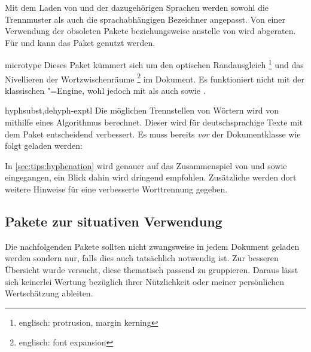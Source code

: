 \begin{packages}
  Mit dem Laden von  und der dazugehörigen Sprachen werden 
  sowohl die Trennmuster als auch die sprachabhängigen Bezeichner angepasst.
  Von einer Verwendung der obsoleten Pakete  beziehungsweise 
   anstelle von  wird abgeraten. Für 
   und  kann das Paket  
  genutzt werden.
\item[microtype]
  Dieses Paket kümmert sich um den optischen Randausgleich%
  \footnote{englisch: protrusion, margin kerning}
  und das Nivellieren der Wortzwischenräume%
  \footnote{englisch: font expansion}
  im Dokument. Es funktioniert nicht mit der klassischen "=Engine, 
  wohl jedoch mit  als auch  sowie .
\item[hyphsubst,dehyph-exptl]
  Die möglichen Trennstellen von Wörtern wird von  mithilfe 
  eines Algorithmus berechnet. Dieser wird für deutschsprachige Texte mit dem 
  Paket  entscheidend verbessert. Es muss bereits \emph{vor} 
  der Dokumentklasse wie folgt geladen werden:
  \begin{Code}[escapechar=§]
    \RequirePackage[ngerman=ngerman-x-latest]{hyphsubst}
  \end{Code}\vspace{-\baselineskip}%
  In \autoref{sec:tips:hyphenation} wird genauer auf das Zusammenspiel von 
   und  sowie  eingegangen,
  ein Blick dahin wird dringend empfohlen. Zusätzliche werden dort weitere 
  Hinweise für eine verbesserte Worttrennung gegeben. 
\end{packages}


\subsection{Pakete zur situativen Verwendung}
Die nachfolgenden Pakete sollten nicht zwangsweise in jedem Dokument geladen 
werden sondern nur, falls dies auch tatsächlich notwendig ist. Zur besseren 
Übersicht wurde versucht, diese thematisch passend zu gruppieren. Daraus lässt 
sich keinerlei Wertung bezüglich ihrer Nützlichkeit oder meiner persönlichen 
Wertschätzung ableiten.

